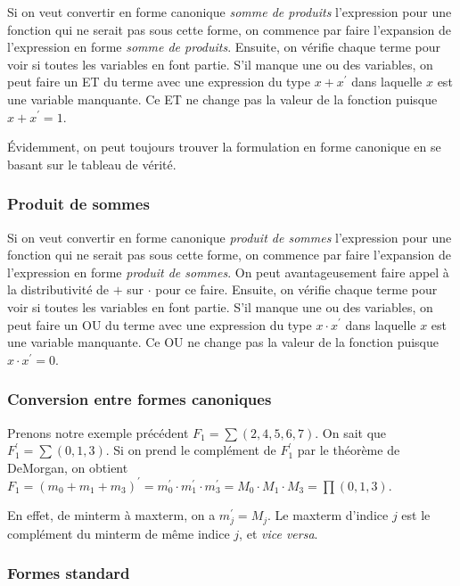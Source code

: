 \documentclass[11pt]{article}
\begin{document}
Si on veut convertir en forme canonique \emph{somme de produits} l'expression
pour une fonction qui ne serait pas sous cette forme, on commence par
faire l'expansion de l'expression en forme \emph{somme de produits}. Ensuite,
on vérifie chaque terme pour voir si toutes les variables en font
partie. S'il manque une ou des variables, on peut faire un ET du
terme avec une expression du type \(x + x^\prime\) dans laquelle \(x\)
est une variable manquante. Ce ET ne change pas la valeur de la
fonction puisque \(x + x^\prime = 1\).

Évidemment, on peut toujours trouver la formulation en forme canonique
en se basant sur le tableau de vérité.

\subsubsection{Produit de sommes}
\label{sec:org80ec497}

Si on veut convertir en forme canonique \emph{produit de sommes} l'expression
pour une fonction qui ne serait pas sous cette forme, on commence par
faire l'expansion de l'expression en forme \emph{produit de sommes}. On peut
avantageusement faire appel à la distributivité de \(+\) sur \(\cdot\)
pour ce faire. Ensuite, on vérifie chaque terme pour voir si toutes
les variables en font partie. S'il manque une ou des variables, on
peut faire un OU du terme avec une expression du type \(x \cdot
x^\prime\) dans laquelle \(x\) est une variable manquante. Ce OU ne
change pas la valeur de la fonction puisque \(x \cdot x^\prime = 0\).

\subsubsection{Conversion entre formes canoniques}
\label{sec:org8612ccc}

Prenons notre exemple précédent \(F_1 = \sum (2, 4, 5, 6, 7)\). On
sait que \(F_1^\prime = \sum (0,1,3)\). Si on prend le complément de
\(F_1^\prime\) par le théorème de DeMorgan, on obtient \(F_1 = (m_0 +
m_1 + m_3)^\prime = m_0^\prime \cdot m_1^\prime \cdot m_3^\prime = M_0
\cdot M_1 \cdot M_3 = \prod (0,1,3)\).

En effet, de minterm à maxterm, on a \(m_j^\prime = M_j\). Le maxterm
d'indice \(j\) est le complément du minterm de même indice \(j\), et
\emph{vice versa}.

\subsubsection{Formes standard}
\label{sec:org2598a74}
\end{document}
